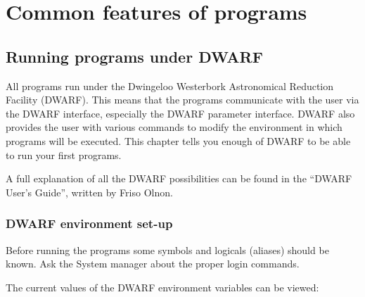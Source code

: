 %
%
\chapter{Common features of \NEWSTAR programs}
\tableofcontents 

\section{Running \NEWSTAR programs under DWARF}
\label{common.descr.dwarf}

All \NEWSTAR programs run under 
the Dwingeloo Westerbork Astronomical Reduction Facility (DWARF). 
This means that the programs communicate with the user
via the DWARF interface, especially the DWARF parameter interface.
DWARF also provides the user with various commands
to modify the environment in which programs will be executed.
This chapter tells you enough of DWARF to be able to run your first
\NEWSTAR programs. 

A full explanation of all the DWARF possibilities can be found in the 
``DWARF User's Guide'', written by Friso Olnon. 


\subsection{DWARF environment set-up}

Before running the programs some symbols and logicals (aliases) should be known.
Ask the System manager about the proper login commands.

The current values of the DWARF environment variables can be viewed:

 

